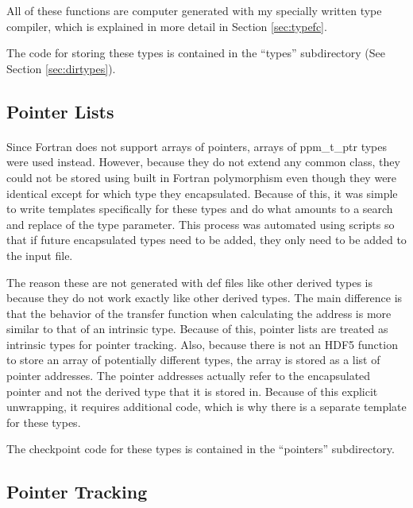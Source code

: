 \documentclass{article}
\begin{document}
All of these functions are computer generated with my specially written type compiler, which is explained in more detail in Section \ref{sec:typefc}.

The code for storing these types is contained in the ``types'' subdirectory (See Section \ref{sec:dirtypes}).

\subsection{Pointer Lists}
\label{sec.ptrlists}
\paragraph{}
Since Fortran does not support arrays of pointers, arrays of ppm\_t\_ptr types were used instead. However, because they do not extend any common class, they could not be stored using built in Fortran polymorphism even though they were identical except for which type they encapsulated. Because of this, it was simple to write templates specifically for these types and do what amounts to a search and replace of the type parameter. This process was automated using scripts so that if future encapsulated types need to be added, they only need to be added to the input file.

The reason these are not generated with def files like other derived types is because they do not work exactly like other derived types. The main difference is that the behavior of the transfer function when calculating the address is more similar to that of an intrinsic type. Because of this, pointer lists are treated as intrinsic types for pointer tracking. Also, because there is not an HDF5 function to store an array of potentially different types, the array is stored as a list of pointer addresses. The pointer addresses actually refer to the encapsulated pointer and not the derived type that it is stored in. Because of this explicit unwrapping, it requires additional code, which is why there is a separate template for these types.

The checkpoint code for these types is contained in the ``pointers'' subdirectory.

\subsection{Pointer Tracking}
\label{sec.ptrtrack}
\end{document}
